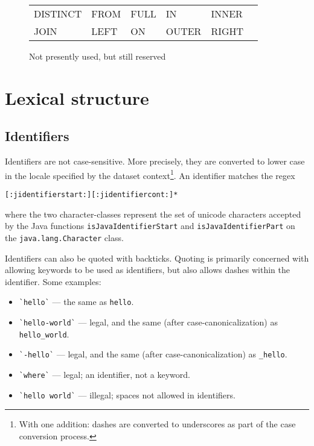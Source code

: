 \documentclass{article}
\begin{document}
\begin{figure}
\begin{center}
\begin{tabular}{l l l l l l}
DISTINCT & FROM & FULL & IN & INNER \\
JOIN & LEFT & ON & OUTER & RIGHT \\
\end{tabular}
\end{center}
\caption{Not presently used, but still reserved}
\label{futurewords}
\end{figure}

\section{Lexical structure}

\subsection{Identifiers}
Identifiers are not case-sensitive.  More precisely, they are
converted to lower case in the locale specified by the dataset
context\footnote{With one addition: dashes are converted to
  underscores as part of the case conversion process.}.  An
identifier matches the regex
\begin{lstlisting}
[:jidentifierstart:][:jidentifiercont:]*
\end{lstlisting}
where the two character-classes represent the set of unicode
characters accepted by the Java functions
\lstinline|isJavaIdentifierStart| and \lstinline|isJavaIdentifierPart|
on the \lstinline|java.lang.Character| class.

Identifiers can also be quoted with backticks.  Quoting is primarily
concerned with allowing keywords to be used as identifiers, but also
allows dashes within the identifier.  Some examples:
\begin{itemize}
\item \lstinline!`hello`! --- the same as \lstinline!hello!.
\item \lstinline!`hello-world`! --- legal, and the same (after case-canonicalization) as \lstinline!hello_world!.
\item \lstinline!`-hello`! --- legal, and the same (after case-canonicalization) as \lstinline!_hello!.
\item \lstinline!`where`! --- legal; an identifier, not a keyword.
\item \lstinline!`hello world`! --- illegal; spaces not allowed in identifiers.
\end{itemize}
\end{document}
